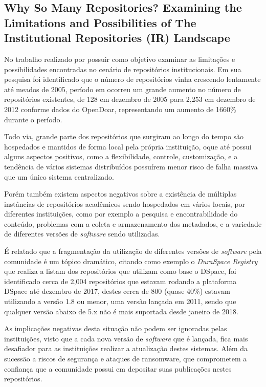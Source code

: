 \subsection{Why So Many Repositories? Examining the Limitations and Possibilities of The Institutional Repositories (IR) Landscape}

No trabalho realizado por \cite{2018:Arlitsch} possuir como objetivo examinar as limitações
e possibilidades encontradas no cenário de repositórios institucionais. Em sua pesquisa
foi identificado que o número de repositórios vinha crescendo lentamente até meados de 2005,
período em ocorreu um grande aumento no número de repositórios existentes, de 128 em dezembro
de 2005 para 2,253 em dezembro de 2012 conforme dados do OpenDoar, representando um aumento
de 1660\% durante o período.

Todo via, grande parte dos repositórios que surgiram ao longo do tempo são hospedados e
mantidos de forma local pela própria instituição, oque até possui alguns aspectos positivos,
como a flexibilidade, controle, customização, e a tendência de vários sistemas distribuídos
possuírem menor risco de falha massiva que um único sistema centralizado.

Porém também existem aspectos negativos sobre a existência de múltiplas instâncias
de repositórios acadêmicos sendo hospedados em vários locais, por diferentes
instituições, como por exemplo a pesquisa e encontrabilidade do conteúdo, problemas
com a coleta e armazenamento dos metadados, e a variedade de diferentes versões de
\emph{software} sendo utilizadas.

É relatado que a fragmentação da utilização de diferentes versões de \emph{software}
pela comunidade é um tópico dramático, citando como exemplo o \emph{DuraSpace Registry}
que realiza a listam dos repositórios que utilizam como base o DSpace, foi identificado
cerca de 2,004 repositórios que estavam rodando a plataforma DSpace até dezembro
de 2017, destes cerca de 800 (quase 40\%) estavam utilizando a versão 1.8 ou
menor, uma versão lançada em 2011, sendo que qualquer versão abaixo de 5.x não é
mais suportada desde janeiro de 2018.

As implicações negativas desta situação não podem ser ignoradas pelas instituições,
visto que a cada nova versão de \emph{software} que é lançada, fica mais desafiador
para as instituições realizar a atualização destes sistemas. Além da sucessão a
riscos de segurança e ataques de ransomware, que comprometem a confiança que a comunidade
possui em depositar suas publicações nestes repositórios.


